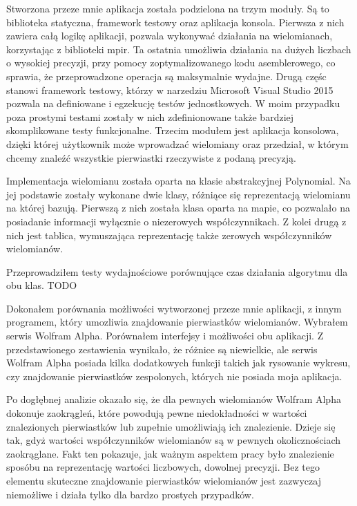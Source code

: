 \documentclass[oneside,a4paper]{book}
\begin{document}
	Stworzona przeze mnie aplikacja została podzielona na trzym moduły. Są to biblioteka statyczna, framework testowy oraz aplikacja konsola. Pierwsza z nich zawiera całą logikę aplikacji, pozwala wykonywać działania na wielomianach, korzystając z biblioteki mpir. Ta ostatnia umożliwia działania na dużych liczbach o wysokiej precyzji, przy pomocy zoptymalizowanego kodu asemblerowego, co sprawia, że przeprowadzone operacja są maksymalnie wydajne. Drugą częśc stanowi framework testowy, którzy w narzedziu Microsoft Visual Studio 2015 pozwala na definiowane i egzekucję testów jednostkowych. W moim przypadku poza prostymi testami zostały w nich zdefinionowane także bardziej skomplikowane testy funkcjonalne. Trzecim modułem jest aplikacja konsolowa, dzięki której użytkownik może wprowadzać wielomiany oraz przedział, w którym chcemy znaleźć wszystkie pierwiastki rzeczywiste z podaną precyzją.
	
	Implementacja wielomianu została oparta na klasie abstrakcyjnej Polynomial. Na jej podstawie zostały wykonane dwie klasy, różniące się reprezentacją wielomianu na której bazują. Pierwszą z nich została klasa oparta na mapie, co pozwalało na posiadanie informacji wyłącznie o niezerowych współczynnikach. Z kolei drugą z nich jest tablica, wymuszająca reprezentację także zerowych współczynników wielomianów.
	
	Przeprowadziłem testy wydajnościowe porównujące czas działania algorytmu dla obu klas. TODO
	
	Dokonałem porównania możliwości wytworzonej przeze mnie aplikacji, z innym programem, który umozliwia znajdowanie pierwiastków wielomianów. Wybrałem serwis Wolfram Alpha. Porównałem interfejsy i możliwości obu aplikacji. Z przedstawionego zestawienia wynikało, że różnice są niewielkie, ale serwis Wolfram Alpha posiada kilka dodatkowych funkcji takich jak rysowanie wykresu, czy znajdowanie pierwiastków zespolonych, których nie posiada moja aplikacja.
	
	Po dogłębnej analizie okazało się, że dla pewnych wielomianów Wolfram Alpha dokonuje zaokrągleń, które powodują pewne niedokładności w wartości znalezionych pierwiastków lub zupełnie umożliwiają ich znalezienie. Dzieje się tak, gdyż wartości współczynników wielomianów są w pewnych okolicznościach zaokrąglane. Fakt ten pokazuje, jak ważnym aspektem pracy było znalezienie sposóbu na reprezentację wartości liczbowych, dowolnej precyzji. Bez tego elementu skuteczne znajdowanie pierwiastków wielomianów jest zazwyczaj niemożliwe i działa tylko dla bardzo prostych przypadków.
	
	\backmatter
	
	\listoftables
	
	
	\nocite{barbeau2003polynomials}
	\nocite{buell2004algorithmic}
	\nocite{burden2015numerical}
	\nocite{childs2012concrete}
	\nocite{cormen2004wprowadzenie}
	\nocite{granlund2015gnu}
	\nocite{kryszewski2014wyklad}
	\nocite{malik2009data}
	\nocite{mcnamee2007numerical}
	\nocite{mora2003solving}
	\nocite{pan2012structured}
	\nocite{polskie1968wiadomosci}
	\nocite{sierpinski1951zasady}
	\nocite{Warmus_Mieczyslaw_(1918-2007)_Metody}
	
	
\end{document}
